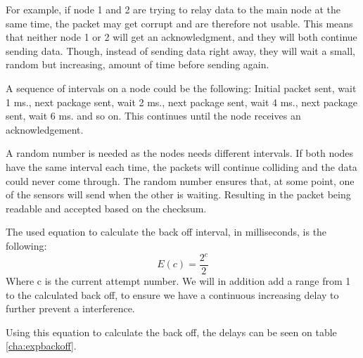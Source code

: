 For example, if node 1 and 2 are trying to relay data to the main node at the same time, the packet may get corrupt and are therefore not usable. This means that neither node 1 or 2 will get an acknowledgment, and they will both continue sending data. Though, instead of sending data right away, they will wait a small, random but increasing, amount of time before sending again.

A sequence of intervals on a node could be the following: Initial packet sent, wait 1 ms., next package sent, wait 2 ms.,  next package sent, wait 4 ms., next package sent, wait 6 ms. and so on. This continues until the node receives an acknowledgement.

A random number is needed as the nodes needs different intervals. If both nodes have the same interval each time, the packets will continue colliding and the data could never come through. The random number ensures that, at some point, one of the sensors will send when the other is waiting. Resulting in the packet being readable and accepted based on the checksum.

The used equation to calculate the back off interval, in milliseconds,  is the following:
\begin{equation}
E(c)=\frac{2^{c}}{2}
\end{equation}
Where c is the current attempt number.
We will in addition add a range from 1 to the calculated back off, to ensure we have a  continuous increasing delay to further prevent a interference.

Using this equation to calculate the back off, the delays can be seen on table \ref{cha:expbackoff}.

